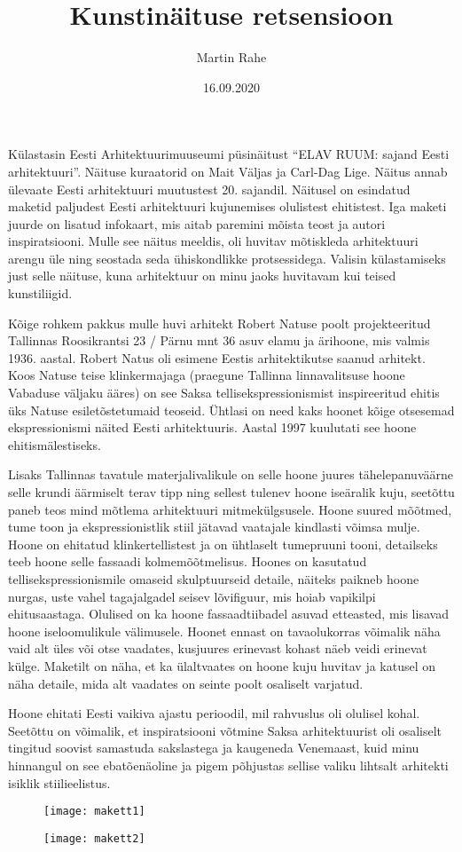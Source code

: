 \documentclass[12pt,a4paper]{article}
\title{Kunstinäituse retsensioon}
\author{Martin Rahe}
\date{16.09.2020}
\begin{document}
	\maketitle
	\thispagestyle{fancy}
	
	Külastasin Eesti Arhitektuurimuuseumi püsinäitust \enquote{ELAV RUUM: sajand Eesti arhitektuuri}. Näituse kuraatorid on Mait Väljas ja Carl-Dag Lige. Näitus annab ülevaate Eesti arhitektuuri muutustest 20. sajandil. Näitusel on esindatud maketid paljudest Eesti arhitektuuri kujunemises olulistest ehitistest. Iga maketi juurde on lisatud infokaart, mis aitab paremini mõista teost ja autori inspiratsiooni. Mulle see näitus meeldis, oli huvitav mõtiskleda arhitektuuri arengu üle ning seostada seda ühiskondlikke protsessidega. Valisin külastamiseks just selle näituse, kuna arhitektuur on minu jaoks huvitavam kui teised kunstiliigid.
	
	Kõige rohkem pakkus mulle huvi arhitekt Robert Natuse poolt projekteeritud Tallinnas Roosikrantsi 23 / Pärnu mnt 36 asuv elamu ja ärihoone, mis valmis 1936. aastal. Robert Natus oli esimene Eestis arhitektikutse saanud arhitekt. Koos Natuse teise klinkermajaga (praegune Tallinna linnavalitsuse hoone Vabaduse väljaku ääres) on see Saksa tellisekspressionismist inspireeritud ehitis üks Natuse esiletõstetumaid teoseid. Ühtlasi on need kaks hoonet kõige otsesemad ekspressionismi näited Eesti arhitektuuris. Aastal 1997 kuulutati see hoone ehitismälestiseks.
	
	Lisaks Tallinnas tavatule materjalivalikule on selle hoone juures tähelepanuväärne selle krundi äärmiselt terav tipp ning sellest tulenev hoone iseäralik kuju, seetõttu paneb teos mind mõtlema arhitektuuri mitmekülgsusele. Hoone suured mõõtmed, tume toon ja ekspressionistlik stiil jätavad vaatajale kindlasti võimsa mulje. Hoone on ehitatud klinkertellistest ja on ühtlaselt tumepruuni tooni, detailseks teeb hoone selle fassaadi kolmemõõtmelisus. Hoones on kasutatud tellisekspressionismile omaseid skulptuurseid detaile, näiteks paikneb hoone nurgas, uste vahel tagajalgadel seisev lõvifiguur, mis hoiab vapikilpi ehitusaastaga. Olulised on ka hoone fassaadtiibadel asuvad etteasted, mis lisavad hoone iseloomulikule välimusele. Hoonet ennast on tavaolukorras võimalik näha vaid alt üles või otse vaadates, kusjuures erinevast kohast näeb veidi erinevat külge. Maketilt on näha, et ka ülaltvaates on hoone kuju huvitav ja katusel on näha detaile, mida alt vaadates on seinte poolt osaliselt varjatud.
	
	Hoone ehitati Eesti vaikiva ajastu perioodil, mil rahvuslus oli olulisel kohal. Seetõttu on võimalik, et inspiratsiooni võtmine Saksa arhitektuurist oli osaliselt tingitud soovist samastuda sakslastega ja kaugeneda Venemaast, kuid minu hinnangul on see ebatõenäoline ja pigem põhjustas sellise valiku lihtsalt arhitekti isiklik stiilieelistus. 
	
	\begin{figure}[h!]
		\texttt{[image: makett1]}
	\end{figure}

	\begin{figure}[h!]
		\texttt{[image: makett2]}
	\end{figure}
\end{document}
